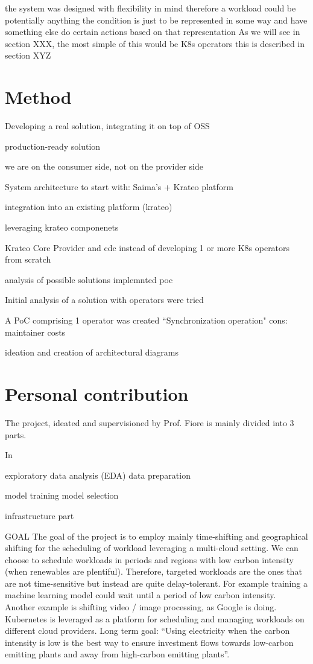 the system was designed with flexibility in mind therefore a workload could be potentially anything
the condition is just to be represented in some way and have something else do certain actions based on that representation
As we will see in section XXX, the most simple of this would be K8s operators
this is described in section XYZ

\section{Method}

Developing a real solution, integrating it on top of OSS

production-ready solution

we are on the consumer side, not on the provider side

System architecture to start with: Saima's + Krateo platform

integration into an existing platform (krateo)


leveraging krateo componenets

Krateo Core Provider and cdc instead of developing 1 or more K8s operators from scratch


analysis of possible solutions
implemnted poc 

Initial analysis of a solution with operators were tried

A PoC comprising 1 operator was created 
``Synchronization operation"
cons: maintainer costs



ideation and creation of architectural diagrams


\section{Personal contribution}

The project, ideated and supervisioned by Prof. Fiore is mainly divided into 3 parts.

In 

exploratory data analysis (EDA)
data preparation

model training
model selection

infrastructure part





GOAL
The goal of the project is to employ mainly time-shifting and geographical shifting for the scheduling of workload leveraging a multi-cloud setting.
We can choose to schedule workloads in periods and regions with low carbon intensity (when renewables are plentiful). 
Therefore, targeted workloads are the ones that are not time-sensitive but instead are quite delay-tolerant. For example training a machine learning model could wait until a period of low carbon intensity. Another example is shifting video / image processing, as Google is doing.
Kubernetes is leveraged as a platform for scheduling and managing workloads on different cloud providers.
Long term goal: “Using electricity when the carbon intensity is low is the best way to ensure investment flows towards low-carbon emitting plants and away from high-carbon emitting plants”.

\newpage